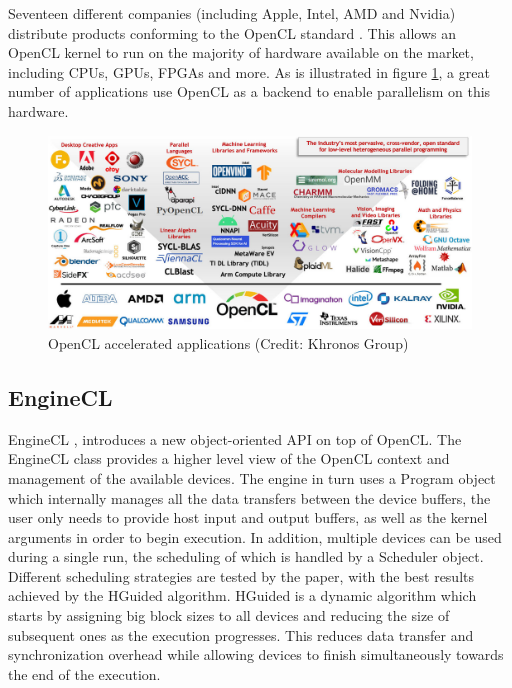 Seventeen different companies (including Apple, Intel, AMD and Nvidia) distribute products conforming to the OpenCL standard \cite{opencl_conformant_companies}. This allows an OpenCL kernel to run on the majority of hardware available on the market, including CPUs, GPUs, FPGAs and more. As is illustrated in figure \ref{fig:opencl_accelerated_apps}, a great number of applications use OpenCL as a backend to enable parallelism on this hardware.

\begin{figure}[ht]
    \centering
    \includegraphics[width=\textwidth]{img/opencl-accelerated-apps.png}
    \captionsetup{justification=centering}
    \caption{OpenCL accelerated applications (Credit: Khronos Group)}
    \label{fig:opencl_accelerated_apps}
\end{figure}

\subsection{EngineCL}
EngineCL \cite{enginecl}, introduces a new object-oriented API on top of OpenCL. The EngineCL class provides a higher level view of the OpenCL context and management of the available devices. The engine in turn uses a Program object which internally manages all the data transfers between the device buffers, the user only needs to provide host input and output buffers, as well as the kernel arguments in order to begin execution. In addition, multiple devices can be used during a single run, the scheduling of which is handled by a Scheduler object. Different scheduling strategies are tested by the paper, with the best results achieved by the HGuided algorithm. HGuided is a dynamic algorithm which starts by assigning big block sizes to all devices and reducing the size of subsequent ones as the execution progresses. This reduces data transfer and synchronization overhead while allowing devices to finish simultaneously towards the end of the execution.

